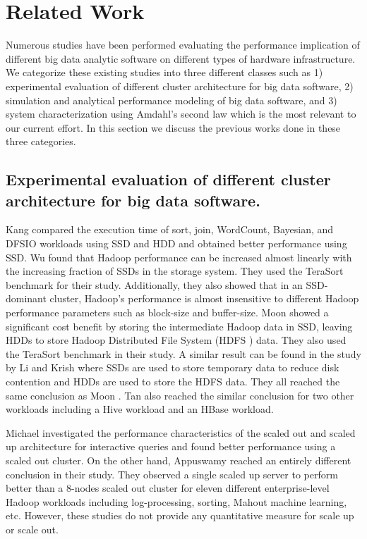 \documentclass[journal]{IEEEtran}
\begin{document}
\section{Related Work}
Numerous studies have been performed evaluating the performance implication of different big data analytic software on different types of hardware infrastructure. We categorize these existing studies into three different classes such as 1) experimental evaluation of different cluster architecture for big data software, 2) simulation and analytical performance modeling of big data software, and 3) system characterization using Amdahl's second law which is the most relevant to our current effort. In this section we discuss the previous works done in these three categories.

\subsection{Experimental evaluation of different cluster architecture for big data software.} 
Kang \cite{ssdhdd:kang} compared the execution time of sort, join, WordCount, Bayesian, and DFSIO workloads using SSD and HDD and obtained better performance using SSD. Wu \cite{ssdhdd:wu} found that Hadoop performance can be increased almost linearly with the increasing fraction of SSDs in the storage system. They used the TeraSort benchmark for their study. Additionally, they also showed that in an SSD-dominant cluster, Hadoop's performance is almost insensitive to different Hadoop performance parameters such as block-size and buffer-size. Moon \cite{ssdhdd:moon} showed a significant cost benefit by storing the intermediate Hadoop data in SSD, leaving HDDs to store Hadoop Distributed File System (HDFS \cite{fw:hdfs}) data. They also used the TeraSort benchmark in their study. A similar result can be found in the study by Li \cite{ssdhdd:li} and Krish \cite{ssdhdd:krish} where SSDs are used to store temporary data to reduce disk contention and HDDs are used to store the HDFS data. They all reached the same conclusion as Moon \cite{ssdhdd:moon}.  Tan \cite{ssdhdd:tan} also reached the similar conclusion for two other workloads including a Hive workload and an HBase workload. 

Michael \cite{scaleupscaleout:michael} investigated the performance characteristics of the scaled out and scaled up architecture for interactive queries and found better performance using a scaled out cluster. On the other hand, Appuswamy \cite{scaleupscaleout:appuswamy} reached an entirely different conclusion in their study. They observed a single scaled up server to perform better than a 8-nodes scaled out cluster for eleven different enterprise-level Hadoop workloads including log-processing, sorting, Mahout machine learning, etc. However, these studies do not provide any quantitative measure for scale up or scale out.  
\end{document}
